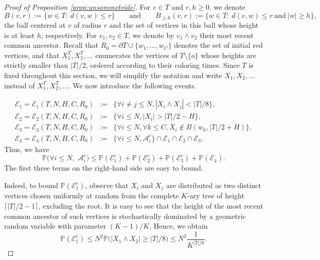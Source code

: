 \documentclass[10pt,a4paper]{amsart}
\newcommand{\Tf}{T}
\renewcommand{\P}{\mathbb{P}}
\begin{document}
\begin{proof}[Proof of Proposition \ref{prop:unsommetvide}]

For $v\in \Tf$ and $r,h\ge 0$, we denote
$$
B(v,r):=\{w\in \Tf:\ d(v,w)\le r\}
\qquad \text{and} \qquad
B_{\ge h}(v,r):=\{w\in \Tf:\ d(v,w)\le r \ \text{and}\ |w|\ge h\},
$$
the ball centered at $v$ of radius $r$ and the set of vertices in this ball whose height is at least $h$, respectively.
For $v_1,v_2\in \Tf$, we denote by $v_1\wedge v_2$ their most recent common ancestor.
Recall that $R_0=\partial \Tf \cup\{w_1,\ldots,w_C\}$ denotes the set of initial red vertices, and that $X^{\Tf}_1,X^{\Tf}_2,\ldots$ enumerates the vertices of $\Tf\setminus\{o\}$ whose heights are strictly smaller than $|\Tf|/2$, ordered according to their coloring times. Since $\Tf$ is fixed throughout this section, we will simplify the notation and write $X_1,X_2,\ldots$ instead of $X^{\Tf}_1,X^{\Tf}_2,\ldots$.
We now introduce the following events.



\begin{eqnarray*}
\mathcal{E}_1=\mathcal{E}_1(\Tf,N,H,C,R_0) &:=& \{\forall i\neq j \le N, |X_i\wedge X_j| < |\Tf|/8\},\\
\mathcal{E}_2=\mathcal{E}_2(\Tf,N,H,C,R_0) &:=& \{\forall i \le N, |X_i|> |\Tf|/2-H\},\\
\mathcal{E}_3=\mathcal{E}_3(\Tf,N,H,C,R_0) &:=& \{\forall i \le N, \forall k \le C, X_i\notin B(w_k,|\Tf|/2+H)\},\\
\mathcal{E}_4=\mathcal{E}_4(\Tf,N,H,C,R_0) &:=&\{\forall i \le N, \mathcal{A}_i^c\}\cap  \mathcal{E}_1 \cap  \mathcal{E}_2 \cap  \mathcal{E}_3.
\end{eqnarray*}
Thus, we have
$$
\P\bigl(\forall i \le N,\; \mathcal{A}_i^c\bigr)
\le \P(\mathcal{E}_1^c)+\P(\mathcal{E}_2^c)+\P(\mathcal{E}_3^c)+\P(\mathcal{E}_4).
$$
The first three terms on the right-hand side are easy to bound.

Indeed, to bound $\P(\mathcal{E}_1^c)$, observe that $X_i$ and $X_j$ are distributed as two distinct vertices chosen uniformly at random from the complete $K$-ary tree of height $\lceil |\Tf|/2-1 \rceil$, excluding the root. It is easy to see that the height of the most recent common ancestor of such vertices is stochastically dominated by a geometric random variable with parameter $(K-1)/K$. Hence, we obtain
\begin{equation}\label{eq:E1}
\P(\mathcal{E}_1^c)
\le N^2 \P\bigl( |X_1 \wedge X_2| \ge |\Tf|/8 \bigr)
\le N^2 \frac{1}{K^{|\Tf|/8}}.
\end{equation}


\end{proof}
\end{document}
